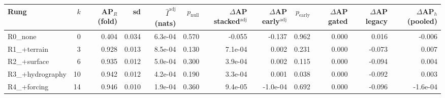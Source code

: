 \begin{tabular}{lrrrrrrrrrrr}
\toprule
Rung & $k$ & AP$_R$ (fold) & sd & $\hat I^{\mathrm{adj}}$ (nats) & $p_{\mathrm{null}}$ & $\Delta$AP stacked$^{\mathrm{adj}}$ & $\Delta$AP early$^{\mathrm{adj}}$ & $p_{\mathrm{early}}$ & $\Delta$AP gated & $\Delta$AP legacy & $\Delta$AP$_h$ (pooled) \\
\midrule
R0\_none & 0 & 0.404 & 0.034 & 6.3e-04 & 0.570 & -0.055 & -0.137 & 0.962 & 0.000 & 0.016 & -0.006 \\
R1\_+terrain & 3 & 0.928 & 0.013 & 8.5e-04 & 0.130 & 7.1e-04 & 0.002 & 0.231 & 0.000 & -0.073 & 0.007 \\
R2\_+surface & 6 & 0.935 & 0.012 & 5.0e-04 & 0.300 & 3.9e-04 & 0.002 & 0.115 & 0.000 & -0.094 & 0.004 \\
R3\_+hydrography & 10 & 0.942 & 0.012 & 4.2e-04 & 0.190 & 3.3e-04 & 0.001 & 0.038 & 0.000 & -0.092 & 0.003 \\
R4\_+forcing & 14 & 0.946 & 0.010 & 1.9e-04 & 0.360 & 9.4e-05 & -1.0e-04 & 0.692 & 0.000 & -0.096 & -1.6e-04 \\
\bottomrule
\end{tabular}
